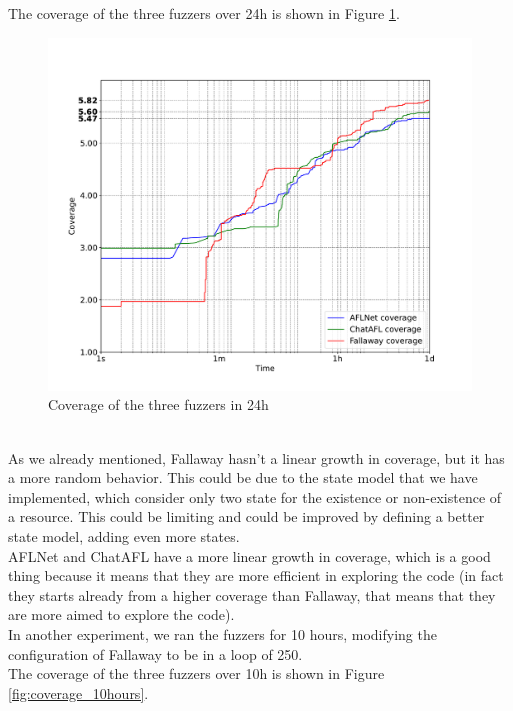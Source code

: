 The coverage of the three fuzzers over 24h is shown in Figure \ref{fig:coverage_1day}.
\begin{figure}[H]
    \centering
    \includegraphics[width=1\textwidth]{Images/coverage_over_time_lighttpd-1day-1000l.pdf}
    \caption{Coverage of the three fuzzers in 24h}
    \label{fig:coverage_1day}
\end{figure}
\phantom{}\\
As we already mentioned, Fallaway hasn't a linear growth in coverage, but it has a more random behavior. This could be due to the state model that we have implemented, which consider only two state for the existence or non-existence of a resource. This could be limiting and could be improved by defining a better state model, adding even more states.
\\AFLNet and ChatAFL have a more linear growth in coverage, which is a good thing because it means that they are more efficient in exploring the code (in fact they starts already from a higher coverage than Fallaway, that means that they are more aimed to explore the code).
\\In another experiment, we ran the fuzzers for 10 hours, modifying the configuration of Fallaway to be in a loop of 250.
\\The coverage of the three fuzzers over 10h is shown in Figure \ref{fig:coverage_10hours}.

